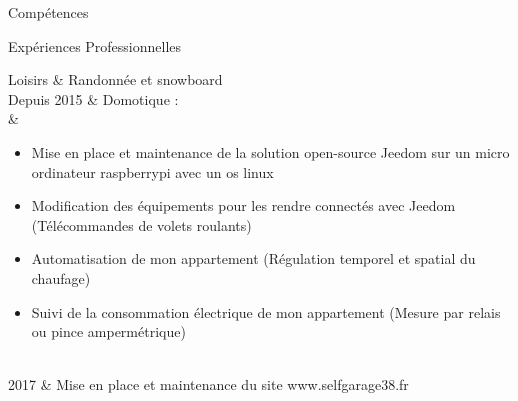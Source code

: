 

\begin{rubriquetableau}[\firstcolumnwidth]{Compétences}
	
	
\end{rubriquetableau}

\begin{rubriquetableau}[\firstcolumnwidth]{Expériences Professionnelles}
    
    
    \newpage
    
    
    
    
    
    
    
\end{rubriquetableau}


\newpage
\begin{rubriquetableau}[\firstcolumnwidth]{Loisirs}
			& Randonnée et snowboard\\
Depuis 2015 & Domotique :\\
			& \begin{itemize}
				\item Mise en place et maintenance de la solution open-source Jeedom sur un micro ordinateur raspberrypi avec un os linux
				\item Modification des équipements pour les rendre connectés avec Jeedom (Télécommandes de volets roulants)
				\item Automatisation de mon appartement (Régulation temporel et spatial du chaufage)
				\item Suivi de la consommation électrique de mon appartement (Mesure par relais ou pince ampermétrique)
			\end{itemize}\\
2017        & Mise en place et maintenance du site www.selfgarage38.fr
\end{rubriquetableau}
